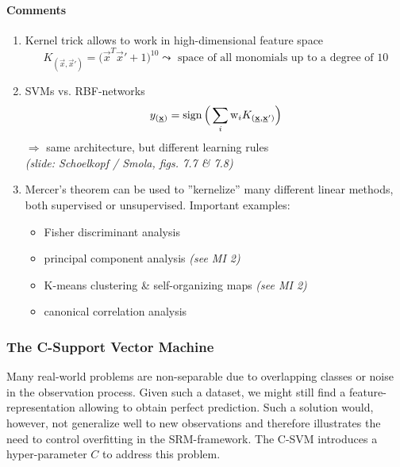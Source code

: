 \paragraph{Comments}
\begin{enumerate}[(1)]
\item Kernel trick allows to work in high-dimensional feature space
  \[ K_{(\vec{x}, \vec{x}')} = \big( \vec{x}^T \vec{x}' + 1 \big)^{10}
  \leadsto \text{ space of all monomials up to a degree of } 10 \]
\item  SVMs vs. RBF-networks
\[ y_{(\underline{\mathbf{x}})} = \operatorname{sign} \Big( \sum\limits_i \mathrm{w}_i 
	K_{(\underline{\mathbf{x}}, \underline{\mathbf{x}}')} \Big) \]
$\Rightarrow$ same architecture, but different learning rules\\
{\it (slide: Schoelkopf / Smola, figs. 7.7 \& 7.8)}

\item Mercer's theorem can be used to ''kernelize'' many different linear methods, both supervised or unsupervised. Important examples: 
\begin{itemize}
	\item Fisher discriminant analysis
	\item principal component analysis {\it (see MI 2)}
	\item K-means clustering \& self-organizing maps {\it (see MI 2)}
	\item canonical correlation analysis
\end{itemize}
\end{enumerate}

\subsubsection{The C-Support Vector Machine}
Many real-world problems are non-separable due to overlapping classes
or noise in the observation process. Given such a dataset, we might still find a feature-representation
allowing to obtain perfect prediction. Such a solution would, however,
not generalize well to new observations and therefore illustrates the
need to control overfitting in the SRM-framework.  The C-SVM
introduces a hyper-parameter $C$ to address this problem.


